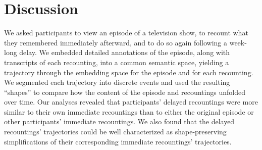 \documentclass[10pt]{article}
\begin{document}
\section*{Discussion}

We asked participants to view an episode of a television show, to recount what they remembered immediately afterward, and to do so again following a week-long delay.
We embedded detailed annotations of the episode, along with transcripts of each recounting, into a common semantic space, yielding a trajectory through the embedding space for the episode and for each recounting.
We segmented each trajectory into discrete events and used the resulting ``shapes'' to compare how the content of the episode and recountings unfolded over time.
Our analyses revealed that participants' delayed recountings were more similar to their own immediate recountings than to either the original episode or other participants' immediate recountings.
We also found that the delayed recountings' trajectories could be well characterized as shape-preserving simplifications of their corresponding immediate recountings' trajectories.
\end{document}

